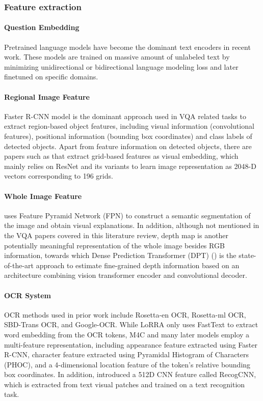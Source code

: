 \documentclass[11pt,a4paper]{article}
\begin{document}
\subsubsection{Feature extraction}
\paragraph{Question Embedding} Pretrained language models \cite{devlin2018bert} have become the dominant text encoders in recent work. These models are trained on massive amount of unlabeled text by minimizing unidirectional or bidirectional language modeling loss and later finetuned on specific domains.
\paragraph{Regional Image Feature}
Faster R-CNN model is the dominant approach used in VQA related tasks to extract region-based object features, including visual information (convolutional features), positional information (bounding box coordinates) and class labels of detected objects. 
Apart from feature information on detected objects, there are papers such as \citet{gao2020multi} that extract grid-based features as visual embedding, which mainly relies on ResNet and its variants to learn image representation as 2048-D vectors corresponding to 196 grids.

\paragraph{Whole Image Feature}\citet{rao2021first} uses Feature Pyramid Network (FPN) to construct a semantic segmentation of the image and obtain visual explanations.
In addition, although not mentioned in the VQA papers covered in this literature review, depth map is another potentially meaningful representation of the whole image besides RGB information, towards which Dense Prediction Transformer (DPT) (\citet{DenseViT}) is the state-of-the-art approach to estimate fine-grained depth information based on an architecture combining vision transformer encoder and convolutional decoder. 

\paragraph{OCR System}OCR methods used in prior work include Rosetta-en OCR, Rosetta-ml OCR, SBD-Trans OCR, and Google-OCR. While LoRRA \cite{Singh_2019_CVPR} only uses FastText to extract word embedding from the OCR tokens, M4C and many later models employ a multi-feature representation, including appearance feature extracted using Faster R-CNN, character feature extracted using Pyramidal Histogram of Characters (PHOC), and a 4-dimensional location feature of the token’s relative bounding box coordinates. In addition, \citet{gao2021sma} introduced a 512D CNN feature called RecogCNN, which is extracted from text visual patches and trained on a text recognition task. 
\end{document}
